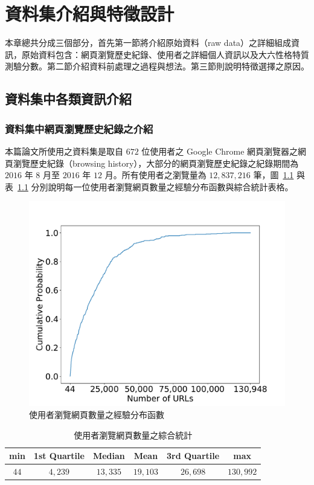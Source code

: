 \chapter{資料集介紹與特徵設計}
{本章總共分成三個部分，首先第一節將介紹原始資料（raw data）之詳細組成資訊，原始資料包含：網頁瀏覽歷史紀錄、使用者之詳細個人資訊以及大六性格特質測驗分數。第二節介紹資料前處理之過程與想法。第三節則說明特徵選擇之原因。}

\section{資料集中各類資訊介紹}
\subsection{資料集中網頁瀏覽歷史紀錄之介紹}
{
本篇論文所使用之資料集是取自 $672$ 位使用者之 Google Chrome 網頁瀏覽器之網頁瀏覽歷史紀錄（browsing history），大部分的網頁瀏覽歷史紀錄之紀錄期間為 $2016$ 年 $8$ 月至 $2016 $ 年 $12$ 月。所有使用者之瀏覽量為 $12,837,216$ 筆，圖~\ref{fig:webcate_distribution} 與表~\ref{tab:url-stat-summary} 分別說明每一位使用者瀏覽網頁數量之經驗分布函數與綜合統計表格。

\begin{figure}
    \graphicspath{{fig/}}
    \begin{center}
    \includegraphics[scale=0.25]{summary_of_url-eps-converted-to.pdf}
    \caption{使用者瀏覽網頁數量之經驗分布函數}
    \label{fig:webcate_distribution}
    \end{center}
\end{figure}

\begin{table}[tbh]
    \centering 
    \caption{使用者瀏覽網頁數量之綜合統計} 
    \label{tab:url-stat-summary}
    \begin{tabular}{c|c|c|c|c|c} 
    \hline min & 1st Quartile & Median &Mean & 3rd Quartile & max \\
    \hline\hline $44$ & $4,239$ & $13,335$ & $19,103$ & $26,698$ & $130,992$ \\
    \hline
    \end{tabular} 
\end{table}

}
